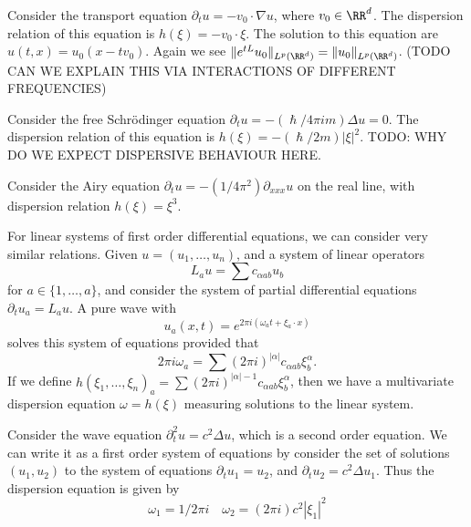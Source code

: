 \begin{example}
    Consider the transport equation $\partial_t u = - v_0 \cdot \nabla u$, where $v_0 \in \RR^d$. The dispersion relation of this equation is $h(\xi) = -v_0 \cdot \xi$. The solution to this equation are $u(t,x) = u_0(x-tv_0)$. Again we see $\| e^{tL} u_0 \|_{L^p(\RR^d)} = \| u_0 \|_{L^p(\RR^d)}$. (TODO CAN WE EXPLAIN THIS VIA INTERACTIONS OF DIFFERENT FREQUENCIES)
\end{example}

\begin{example}
    Consider the free Schr\"{o}dinger equation $\partial_t u = - (\hslash / 4 \pi i m) \Delta u = 0$. The dispersion relation of this equation is $h(\xi) = -(\hslash/2 m)|\xi|^2$. TODO: WHY DO WE EXPECT DISPERSIVE BEHAVIOUR HERE.
\end{example}

\begin{example}
    Consider the Airy equation $\partial_t u = - (1/4\pi^2) \partial_{xxx} u$ on the real line, with dispersion relation $h(\xi) = \xi^3$.
\end{example}

For linear systems of first order differential equations, we can consider very similar relations. Given $u = (u_1,\dots,u_n)$, and a system of linear operators
%
\[ L_a u = \sum c_{\alpha ab} u_b \]
%
for $a \in \{ 1, \dots , a \}$, and consider the system of partial differential equations $\partial_t u_a = L_a u$. A pure wave with
%
\[ u_a(x,t) = e^{2 \pi i (\omega_a t + \xi_a \cdot x)} \]
%
solves this system of equations provided that
%
\[ 2 \pi i \omega_a = \sum (2 \pi i)^{|\alpha|} c_{\alpha ab} \xi_b^\alpha. \]
%
If we define $h(\xi_1,\dots,\xi_n)_a = \sum (2 \pi i)^{|\alpha| - 1} c_{\alpha ab} \xi_b^\alpha$, then we have a multivariate dispersion equation $\omega = h(\xi)$ measuring solutions to the linear system.

\begin{example}
    Consider the wave equation $\partial^2_t u = c^2 \Delta u$, which is a second order equation. We can write it as a first order system of equations by consider the set of solutions $(u_1,u_2)$ to the system of equations $\partial_t u_1 = u_2$, and $\partial_t u_2 = c^2 \Delta u_1$. Thus the dispersion equation is given by
    \[ \omega_1 = 1/2\pi i \quad \omega_2 = (2 \pi i) c^2 |\xi_1|^2 \]
\end{example}


